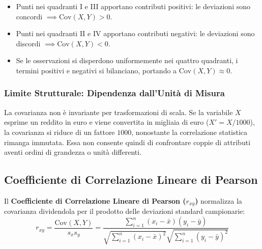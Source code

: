 \begin{itemize}
    \item Punti nei quadranti I e III apportano contributi positivi: le deviazioni sono concordi $\implies \text{Cov}(X, Y) > 0$.
    \item Punti nei quadranti II e IV apportano contributi negativi: le deviazioni sono discordi $\implies \text{Cov}(X, Y) < 0$.
    \item Se le osservazioni si disperdono uniformemente nei quattro quadranti, i termini positivi e negativi si bilanciano, portando a $\text{Cov}(X, Y) \approx 0$.
\end{itemize}

\subsubsection{Limite Strutturale: Dipendenza dall'Unità di Misura}
La covarianza non è invariante per trasformazioni di scala. Se la variabile $X$ esprime un reddito in euro e viene convertita in migliaia di euro ($X' = X / 1000$), la covarianza si riduce di un fattore $1000$, nonostante la correlazione statistica rimanga immutata. Essa non consente quindi di confrontare coppie di attributi aventi ordini di grandezza o unità differenti.

\FloatBarrier
\subsection{Coefficiente di Correlazione Lineare di Pearson}

Il \textbf{Coefficiente di Correlazione Lineare di Pearson ($r_{xy}$)} normalizza la covarianza dividendola per il prodotto delle deviazioni standard campionarie:
\begin{equation}
    r_{xy} = \frac{\text{Cov}(X, Y)}{s_x s_y} = \frac{\sum_{i=1}^n (x_i - \bar{x})(y_i - \bar{y})}{\sqrt{\sum_{i=1}^n (x_i - \bar{x})^2} \sqrt{\sum_{i=1}^n (y_i - \bar{y})^2}}
\end{equation}

